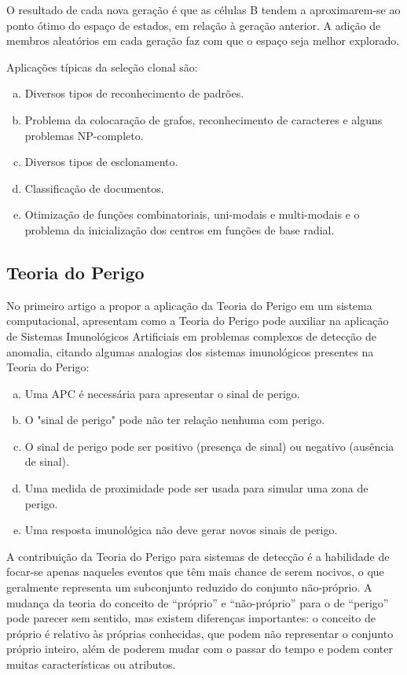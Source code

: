 O resultado de cada nova geração é que as células B tendem a aproximarem-se ao ponto ótimo do espaço de estados, em relação à geração anterior. A adição de membros aleatórios em cada geração faz com que o espaço seja melhor explorado.

Aplicações típicas da seleção clonal são:

\begin{enumerate}[a)]
    \item Diversos tipos de reconhecimento de padrões.
    \item Problema da colocaração de grafos, reconhecimento de caracteres e alguns problemas NP-completo.
    \item Diversos tipos de esclonamento.
    \item Classificação de documentos.
    \item Otimização de funções combinatoriais, uni-modais e multi-modais e o problema da inicialização dos centros em funções de base radial.
\end{enumerate}

\subsection{Teoria do Perigo}

No primeiro artigo a propor a aplicação da Teoria do Perigo em um sistema computacional, \citet{Aickelin2002} apresentam como a Teoria do Perigo pode auxiliar na aplicação de Sistemas Imunológicos Artificiais em problemas complexos de detecção de anomalia, citando algumas analogias dos sistemas imunológicos presentes na Teoria do Perigo:

\begin{enumerate}[a)]
    \item Uma APC é necessária para apresentar o sinal de perigo.
    \item O "sinal de perigo" pode não ter relação nenhuma com perigo.
    \item O sinal de perigo pode ser positivo (presença de sinal) ou negativo (ausência de sinal).
    \item Uma medida de proximidade pode ser usada para simular uma zona de perigo.
    \item Uma resposta imunológica não deve gerar novos sinais de perigo.
\end{enumerate}

A contribuição da Teoria do Perigo para sistemas de detecção é a habilidade de focar-se apenas naqueles eventos que têm mais chance de serem nocivos, o que geralmente representa um subconjunto reduzido do conjunto não-próprio. A mudança da teoria do conceito de ``próprio'' e ``não-próprio'' para o de ``perigo'' pode parecer sem sentido, mas existem diferenças importantes: o conceito de próprio é relativo às próprias conhecidas, que podem não representar o conjunto próprio inteiro, além de poderem mudar com o passar do tempo e podem conter muitas características ou atributos.

